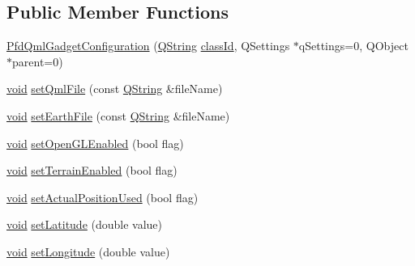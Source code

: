 \subsection*{\-Public \-Member \-Functions}
\begin{DoxyCompactItemize}
\item 
\hyperlink{class_pfd_qml_gadget_configuration_a54f1c01beaedf27b9942cfef21e02c68}{\-Pfd\-Qml\-Gadget\-Configuration} (\hyperlink{group___u_a_v_objects_plugin_gab9d252f49c333c94a72f97ce3105a32d}{\-Q\-String} \hyperlink{group___core_plugin_gac953657221ba7fda967ada0408332641}{class\-Id}, \-Q\-Settings $\ast$q\-Settings=0, \-Q\-Object $\ast$parent=0)
\item 
\hyperlink{group___u_a_v_objects_plugin_ga444cf2ff3f0ecbe028adce838d373f5c}{void} \hyperlink{class_pfd_qml_gadget_configuration_add530fb1fb1a12917018e7dc239e2635}{set\-Qml\-File} (const \hyperlink{group___u_a_v_objects_plugin_gab9d252f49c333c94a72f97ce3105a32d}{\-Q\-String} \&file\-Name)
\item 
\hyperlink{group___u_a_v_objects_plugin_ga444cf2ff3f0ecbe028adce838d373f5c}{void} \hyperlink{class_pfd_qml_gadget_configuration_aeaec2eb0b59f88ca387f4c8f05aab1a1}{set\-Earth\-File} (const \hyperlink{group___u_a_v_objects_plugin_gab9d252f49c333c94a72f97ce3105a32d}{\-Q\-String} \&file\-Name)
\item 
\hyperlink{group___u_a_v_objects_plugin_ga444cf2ff3f0ecbe028adce838d373f5c}{void} \hyperlink{class_pfd_qml_gadget_configuration_a86d2f75f19af4da9db4702f5760b44fe}{set\-Open\-G\-L\-Enabled} (bool flag)
\item 
\hyperlink{group___u_a_v_objects_plugin_ga444cf2ff3f0ecbe028adce838d373f5c}{void} \hyperlink{class_pfd_qml_gadget_configuration_a0e2cd3589d30a04b4db4a948a56cfe7f}{set\-Terrain\-Enabled} (bool flag)
\item 
\hyperlink{group___u_a_v_objects_plugin_ga444cf2ff3f0ecbe028adce838d373f5c}{void} \hyperlink{class_pfd_qml_gadget_configuration_ac5751a8cd63d1fa62461dcc139ab950c}{set\-Actual\-Position\-Used} (bool flag)
\item 
\hyperlink{group___u_a_v_objects_plugin_ga444cf2ff3f0ecbe028adce838d373f5c}{void} \hyperlink{class_pfd_qml_gadget_configuration_a5dfda99122f3f1e7d2e8144f95f2c08a}{set\-Latitude} (double value)
\item 
\hyperlink{group___u_a_v_objects_plugin_ga444cf2ff3f0ecbe028adce838d373f5c}{void} \hyperlink{class_pfd_qml_gadget_configuration_a61c40ee7891fdc413f2e65d35f45075e}{set\-Longitude} (double value)
\item 

\end{DoxyCompactItemize}
